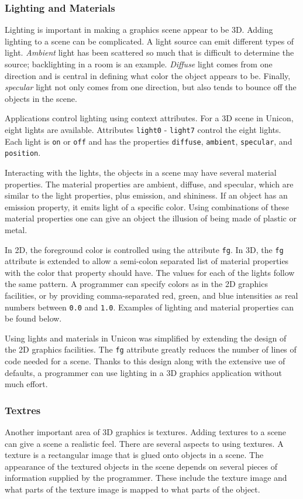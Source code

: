 \subsubsection{Lighting and Materials}

Lighting is important in making a graphics scene appear to be 3D.
Adding lighting to a scene can be complicated. A light source can
emit different types of light. {\em Ambient\/} light has
been scattered so much that is difficult to determine the source;
backlighting in a room is an example. {\em Diffuse\/} light
comes from one direction and is central in defining what color
the object appears to be. Finally, {\em specular\/} light not only comes from
one direction, but also tends to bounce off the objects in the scene.

Applications control lighting using context attributes. For a 3D scene
in Unicon, eight lights are available. Attributes \texttt{light0}
- \texttt{light7} control the eight lights. Each light is
\texttt{on} or \texttt{off} and has the properties \texttt{diffuse},
\texttt{ambient}, \texttt{specular}, and \texttt{position}. 

Interacting with the lights, the objects in a scene may have
several material properties. The material properties are ambient,
diffuse, and specular, which are similar to the light properties, plus
emission, and shininess. If an object has an emission property, it
emits light of a specific color. Using combinations of these material
properties one can give an object the illusion of being made of plastic
or metal.

In 2D, the foreground color is controlled using the attribute \texttt{fg}.
In 3D, the \texttt{fg} attribute is extended to allow a
semi-colon separated list of material properties with the color that
property should have. The values for each of the lights follow the same
pattern. A programmer can specify colors as in the 2D graphics
facilities, or by providing comma-separated red, green, and blue
intensities as real numbers between \texttt{0.0} and \texttt{1.0}.
Examples of lighting and material properties can be found below.

Using lights and materials in Unicon was simplified by extending the
design of the 2D graphics facilities. The \texttt{fg} attribute greatly
reduces the number of lines of code needed for a scene. Thanks to this
design along with the extensive use of defaults, a programmer can use
lighting in a 3D graphics application without much effort.

\subsubsection[Textures]{Textres}
Another important area of 3D graphics is textures.
Adding textures to a scene can give a scene a realistic feel.
There are several aspects to using textures. A texture
is a rectangular image that is
{\textquotedbl}glued{\textquotedbl} onto objects in a scene. The
appearance of the textured objects in the scene depends on several
pieces of information supplied by the programmer. These include the
texture image and what parts of the texture image is mapped to what
parts of the object.

